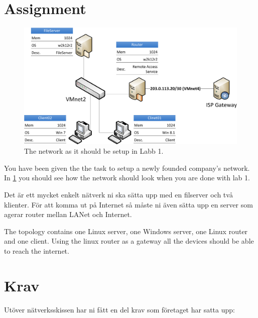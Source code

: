 \documentclass[paper=a4, fontsize=11pt]{report} %
\begin{document}
\section{Assignment}
\begin{figure}[h]
\centering
\includegraphics[width=1\linewidth]{./network}
\caption[Figur över nätverket i labb 1]{The network as it should be setup in Labb 1.}
\label{fig:network}
\end{figure}

You have been given the the task to setup a newly founded company's network. In \figurename \ref{fig:network} you should see how the network should look when you are done with lab 1.

Det är ett mycket enkelt nätverk ni ska sätta upp med en filserver och två klienter. För att komma ut på Internet så måste ni även sätta upp en server som agerar router mellan LANet och Internet.

The topology contains one Linux server, one Windows server, one Linux router and one client. Using the linux router as a gateway all the devices should be able to reach the internet.

\section{Krav}
\label{tasks}
Utöver nätverksskissen har ni fått en del krav som företaget har satta upp:
\end{document}
